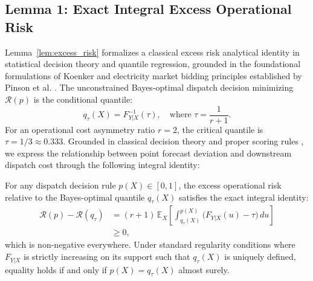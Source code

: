 \subsection{Lemma 1: Exact Integral Excess Operational Risk}
Lemma~\ref{lem:excess_risk} formalizes a classical excess risk analytical identity in statistical decision theory and quantile regression, grounded in the foundational formulations of Koenker \cite{koenker2005} and electricity market bidding principles established by Pinson et al. \cite{pinson2007trading}. The unconstrained Bayes-optimal dispatch decision minimizing $\mathcal{R}(p)$ is the conditional quantile:
\begin{equation}
q_\tau(X) = F_{Y|X}^{-1}(\tau), \quad \text{where } \tau = \frac{1}{r + 1}.
\label{eq:bayes_quantile}
\end{equation}
For an operational cost asymmetry ratio $r=2$, the critical quantile is $\tau = 1/3 \approx 0.333$. Grounded in classical decision theory and proper scoring rules \cite{koenker2005,morales2014,pinson2007trading}, we express the relationship between point forecast deviation and downstream dispatch cost through the following integral identity:

\begin{lemma}
\label{lem:excess_risk}
For any dispatch decision rule $p(X) \in [0, 1]$, the excess operational risk relative to the Bayes-optimal quantile $q_\tau(X)$ satisfies the exact integral identity:
\begin{equation}
\begin{aligned}
\mathcal{R}(p) - \mathcal{R}(q_\tau) &= (r + 1) \, \mathbb{E}_X \left[ \int_{q_\tau(X)}^{p(X)} \Big( F_{Y|X}(u) - \tau \Big) \, du \right] \\
&\ge 0,
\end{aligned}
\label{eq:exact_integral}
\end{equation}
which is non-negative everywhere. Under standard regularity conditions where $F_{Y|X}$ is strictly increasing on its support such that $q_\tau(X)$ is uniquely defined, equality holds if and only if $p(X) = q_\tau(X)$ almost surely.
\end{lemma}

